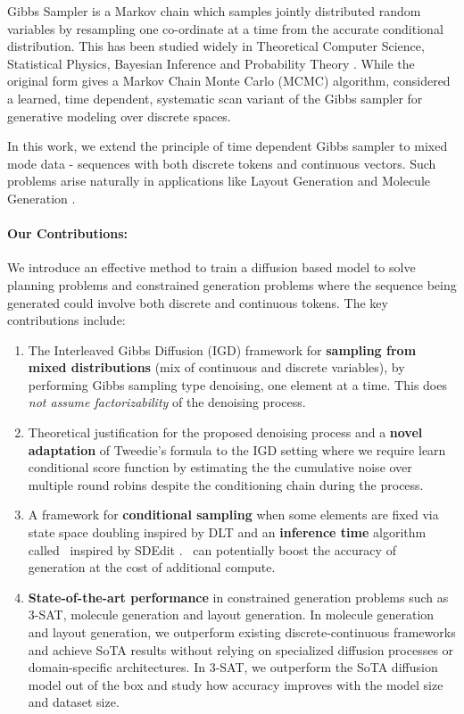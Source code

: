 Gibbs Sampler is a Markov chain which samples jointly distributed random variables by resampling one co-ordinate at a time from the accurate conditional distribution. This has been studied widely in Theoretical Computer Science, Statistical Physics, Bayesian Inference and Probability Theory \cite{geman1984stochastic,turchin1971computation,gelfand1990sampling,martinelli1999lectures,levin2017markov}. While the original form gives a Markov Chain Monte Carlo (MCMC) algorithm, \cite{varma2024glauber} considered a learned, time dependent, systematic scan variant of the Gibbs sampler for generative modeling over discrete spaces. 

In this work, we extend the principle of time dependent Gibbs sampler to mixed mode data - sequences with both discrete tokens and continuous vectors.
Such problems arise naturally in applications like Layout Generation \cite{levi2023dlt} and Molecule Generation \cite{hua2024mudiff}.



\paragraph{Our Contributions:}
We introduce an effective method to train a diffusion based model to solve planning problems and constrained generation problems where the sequence being generated could involve both discrete and continuous tokens. The key contributions include:
\begin{enumerate}
\item The Interleaved Gibbs Diffusion (IGD) framework for \textbf{sampling from mixed distributions} (mix of continuous and discrete variables), by performing Gibbs sampling type denoising, one element at a time. This does \textit{not assume factorizability} of the denoising process.




\item Theoretical justification for the proposed denoising process and a \textbf{novel adaptation} of Tweedie's formula to the IGD setting where we require learn conditional score function by estimating the the cumulative noise over multiple round robins despite the conditioning chain during the process. 

\item A framework for \textbf{conditional sampling} when some elements are fixed via state space doubling inspired by DLT \cite{levi2023dlt} and an \textbf{inference time} algorithm called \redenoise~inspired by SDEdit \cite{meng2021sdedit}. \redenoise~can potentially boost the accuracy of generation at the cost of additional compute.
\item \textbf{State-of-the-art performance} in constrained generation problems such as 3-SAT, molecule generation and layout generation. In molecule generation and layout generation, we outperform existing discrete-continuous frameworks and achieve SoTA results without relying on specialized diffusion processes or domain-specific architectures. In 3-SAT, we outperform the SoTA diffusion model out of the box and study how accuracy improves with the model size and dataset size.

\end{enumerate}

